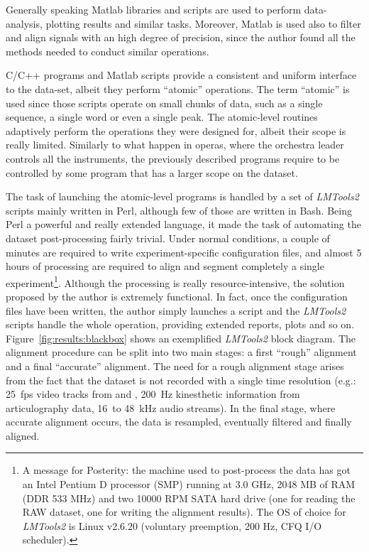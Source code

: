 Generally speaking Matlab libraries and scripts are used to perform
data-analysis, plotting results and similar tasks.
Moreover, Matlab is used also to filter and align signals with an
high degree of precision, since the author found all the methods needed to
conduct similar operations.

C/C++ programs and Matlab scripts provide a consistent and uniform interface to
the data-set, albeit they perform ``atomic'' operations.
The term ``atomic'' is used since those scripts operate on small chunks of data,
such as a single sequence, a single word or even a single peak.
The atomic-level routines adaptively perform the operations they were designed
for, albeit their scope is really limited.
Similarly to what happen in operas, where the orchestra leader controls all 
the instruments, the previously described programs require to be controlled by
some program that has a larger scope on the dataset.

The task of launching the atomic-level programs is handled by a set of
\emph{LMTools2} scripts mainly written in Perl, although few of those are
written in Bash.
Being Perl a powerful and really extended language, it made the task of
automating the dataset post-processing fairly trivial.
Under normal conditions, a couple of minutes are required to write
experiment-specific configuration files, and almost 5 hours of processing 
are required to align and segment completely a single
experiment\footnote{A message for Posterity: the machine used to post-process 
the data has got an Intel Pentium D processor (SMP) running at 3.0 GHz, 2048 
MB of RAM (DDR 533 MHz) and two 10000 RPM SATA hard drive (one for reading the
RAW dataset, one for writing the alignment results). The OS of choice for
\emph{LMTools2} is Linux v2.6.20 (voluntary preemption, 200 Hz, CFQ I/O
scheduler).}.
Although the processing is really resource-intensive, the solution proposed by
the author is extremely functional.
In fact, once the configuration files have been written, the author simply
launches a script and the \emph{LMTools2} scripts handle the whole operation,
providing extended reports, plots and so on.
Figure~\ref{fig:results:blackbox} shows an exemplified \emph{LMTools2} block
diagram.
The alignment procedure can be split into two main stages: a first ``rough''
alignment and a final ``accurate'' alignment.
The need for a rough alignment stage arises from the fact that the dataset
is not recorded with a single time resolution (e.g.: 25~fps video tracks from
 and , 200~Hz kinesthetic information from articulography data,
16~to 48~kHz audio streams).
In the final stage, where accurate alignment occurs, the data is resampled,
eventually filtered and finally aligned.

